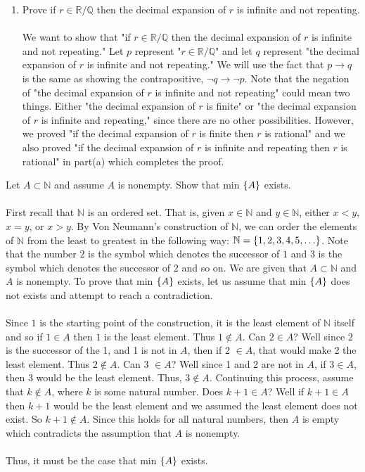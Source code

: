\documentclass[12pt]{article}
\begin{document}
\begin{enumerate}
\item Prove if $r \in \mathbb{R} / \mathbb{Q}$ then the decimal expansion of $r$ is infinite and not repeating. \\ \\ 
We want to show that "if $r \in \mathbb{R} / \mathbb{Q}$ then the decimal expansion of $r$ is infinite and not repeating." Let $p$ represent "$r \in \mathbb{R} / \mathbb{Q}$" and let $q$ represent "the decimal expansion of $r$ is infinite and not repeating." We will use the fact that $p \rightarrow q$ is the same as showing the contrapositive, $\lnot{}q \rightarrow \lnot{}p$. Note that the negation of "the decimal expansion of $r$ is infinite and not repeating" could mean two things. Either "the decimal expansion of $r$ is finite" or "the decimal expansion of $r$ is infinite and repeating," since there are no other possibilities.  However, we proved "if the decimal expansion of $r$ is finite then $r$ is rational" and we also proved "if the decimal expansion of $r$ is infinite and repeating then $r$ is rational" in part(a) which completes the proof. 
\end{enumerate}
\problem

\noindent Let $A \subset \mathbb{N}$ and assume $A$ is nonempty. Show that min $\left\{A\right\}$ exists. \\ \\
First recall that $\mathbb{N}$ is an ordered set. That is, given $x \in \mathbb{N}$ and $y \in \mathbb{N}$, either $x<y$, $x=y$, or $x>y$. By Von Neumann's construction of $\mathbb{N}$, we can order the elements of $\mathbb{N}$ from the least to greatest in the following way: $\mathbb{N}=\left\{1,2,3,4,5,\ldots\right\}$. Note that the number $2$ is the symbol which denotes the successor of $1$ and $3$ is the symbol which denotes the successor of $2$ and so on. We are given that  $A \subset \mathbb{N}$ and $A$ is nonempty. To prove that min $\left\{A\right\}$ exists, let us assume that min $\left\{A\right\}$ does not exists and attempt to reach a contradiction. \\ \\
Since $1$ is the starting point of the construction, it is the least element of $\mathbb{N}$ itself and so if $1 \in A$ then $1$ is the least element. Thus $1 \notin A$. Can $2 \in A$? Well since 2 is the successor of the 1, and 1 is not in $A$, then if 2 $\in A$, that would make 2 the least element. Thus $2 \notin A$. Can 3 $\in A$? Well since 1 and 2 are not in $A$, if $3 \in A$, then $3$ would be the least element. Thus, $3 \notin A$. Continuing this process, assume that $k \notin A$, where $k$ is some natural number. Does $k+1 \in A$? Well if $k+1 \in A$ then $k+1$ would be the least element and we assumed the least element does not exist. So $k+1 \notin A$. Since this holds for all natural numbers, then $A$ is empty which contradicts the assumption that $A$ is nonempty.   \\ \\
Thus, it must be the case that min $\left\{A\right\}$ exists. \\ \\
\end{document}
